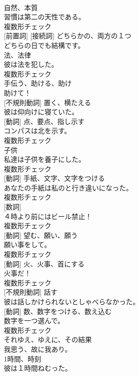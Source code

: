 \documentclass[8pt]{extreport}
\begin{document}
\begin{CJK}{UTF8}{min}
\\	[名詞]	自然、本質	
\\	習慣は第二の天性である。	
\\	複数形チェック
\\	[副詞] [前置詞] [接続詞]	どちらかの、両方の１つ	
\\	どちらの日でも結構です。	
\\	[名詞]	法、法律	
\\	彼は法を犯した。	
\\	複数形チェック
\\	[動詞]	手伝う、助ける、助け	
\\	助けて！	
\\	[動詞] [不規則動詞]	置く、横たえる	
\\	彼は仰向けに寝ていた。	
\\	[名詞] [動詞]	点、要点、指し示す	
\\	コンパスは北を示す。	
\\	複数形チェック
\\	[名詞]	子供	
\\	私達は子供を養子にした。	
\\	複数形チェック
\\	[名詞] [動詞]	手紙、文字、文字をつける	
\\	あなたの手紙は私のと行き違いになった。	
\\	複数形チェック
\\	[名詞] [数詞]	
\\	４時より前にはビール禁止！	
\\	複数形チェック
\\	[名詞] [動詞]	望む、願い、願う	
\\	願い事をして。	
\\	複数形チェック
\\	[名詞] [動詞]	火、火事、首にする	
\\	火事だ！	
\\	複数形チェック
\\	[動詞] [不規則動詞]	話す	
\\	彼は話しかけられないとしゃべらなかった。	
\\	[名詞] [動詞]	数、数字をつける、数え込む	
\\	数字を一つ選んで。	
\\	複数形チェック
\\	[副詞]	それゆえ、ゆえに、その結果	
\\	我思う、故に我あり。	
\\	[名詞]	1時間、時刻	
\\	彼は１時間ねむった。	

\end{CJK}
\end{document}
